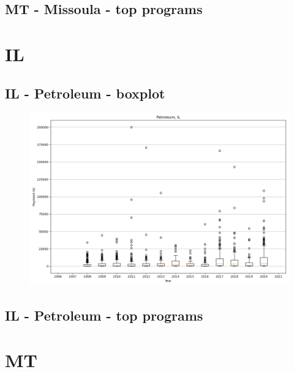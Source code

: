 \subsection*{MT - Missoula - top programs}

\newpage
\section*{IL}
\subsection*{IL - Petroleum - boxplot}
\begin{figure}[h]
\centering
\includegraphics[width=7in]{../output/boxplots/counties/Petroleum-IL_boxplot.png}
\end{figure}


\subsection*{IL - Petroleum - top programs}

\newpage
\section*{MT}
